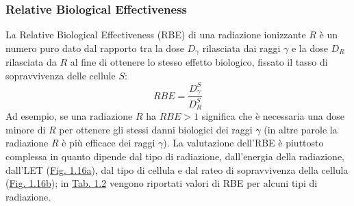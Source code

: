 \documentclass[12pt,a4paper,twoside]{report}
\begin{document}
	\subsubsection{Relative Biological Effectiveness}
	La Relative Biological Effectiveness (RBE) di una radiazione ionizzante $R$ è un numero puro dato dal rapporto tra la dose $D_\gamma$ rilasciata dai raggi $\gamma$ e la dose $D_R$ rilasciata da $R$ al fine di ottenere lo stesso effetto biologico, fissato il tasso di sopravvivenza delle cellule $S$:
	\begin{equation}
		RBE=\frac{D^S_\gamma}{D^S_R}
		\label{eq:rbe}
	\end{equation}
	Ad esempio, se una radiazione $R$ ha $RBE>1$ significa che è necessaria una dose minore di $R$ per ottenere gli stessi danni biologici dei raggi $\gamma$ (in altre parole la radiazione $R$ è più efficace dei raggi $\gamma$). La valutazione dell'RBE è piuttosto complessa in quanto dipende dal tipo di radiazione, dall'energia della radiazione, dall'LET (\hyperref[fig:let_rbe]{Fig. 1.16a}), dal tipo di cellula e dal rateo di sopravvivenza della cellula (\hyperref[fig:survival_dose]{Fig. 1.16b}); in \hyperref[tab:let_rbe]{Tab. 1.2} vengono riportati valori di RBE per alcuni tipi di radiazione.
	
\end{document}
